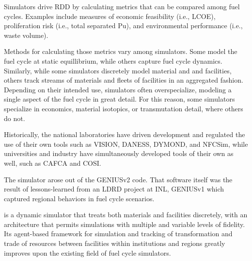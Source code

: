 

Simulators drive \gls{RDD} by calculating metrics that can be compared among fuel 
cycles. Examples include measures of economic feasibility (i.e., \gls{LCOE}), 
proliferation risk (i.e., total separated Pu), and environmental performance 
(i.e., waste volume). 

Methods for calculating those metrics vary among simulators. Some model the 
fuel cycle at static equillibrium, while others capture fuel cycle dynamics.  
Similarly, while some simulators discretely model material and and facilities, 
others track streams of materials and fleets of facilities in an aggregated 
fashion. Depending on their intended use, simulators often overspecialize, 
modeling a single aspect of the fuel cycle in great detail. For this reason, 
some simulators specialize in economics, material isotopics, or transmutation 
detail, where others do not. 

Historically, the national laboratories have driven development and regulated 
the use of their own tools such as \gls{VISION}\cite{jacobson_verifiable_2010}, 
\gls{DANESS}\cite{van_den_durpel_daness_2009}, 
\gls{DYMOND}\cite{modeling_yacout_2005}, and 
\gls{NFCSim}\cite{schneider_nfcsim:_2005}, while universities and industry have 
simultaneously developed tools of their own as well, such as 
\gls{CAFCA}\cite{guerin_benchmark_2006} and \gls{COSI}\cite{cosi}.

The \Cyclus simulator arose out of the 
\gls{GENIUSv2}\cite{oliver_studying_2009,huff_geniusv2_2009} code. That software 
itself was the result of lessons-learned from an \gls{LDRD} project at 
\gls{INL}, 
\gls{GENIUSv1}\cite{dunzik-gougar_global_2007,jain_transitioning_2006} which 
captured regional behaviors in fuel cycle scenarios. 

\Cyclus is a dynamic simulator that treats both materials and facilities discretely, with an 
architecture that permits simulations with multiple and variable levels of 
fidelity. Its agent-based framework for simulation and tracking of 
transformation and trade of resources between facilities within institutions 
and regions greatly improves upon the existing field of fuel cycle simulators.

